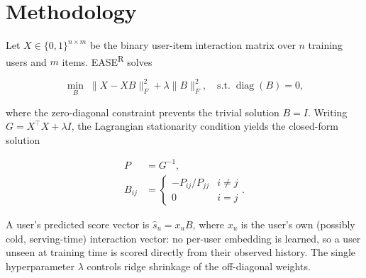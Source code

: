 \section{Methodology}
Let $X \in \{0,1\}^{n \times m}$ be the binary user-item interaction matrix
over $n$ training users and $m$ items. EASE\textsuperscript{R} solves

\begin{equation}
  \min_{B} \; \lVert X - XB \rVert_F^2 + \lambda \lVert B \rVert_F^2,
  \quad \text{s.t.} \; \operatorname{diag}(B) = 0,
  \label{eq:objective}
\end{equation}

where the zero-diagonal constraint prevents the trivial solution $B = I$.
Writing $G = X^\top X + \lambda I$, the Lagrangian stationarity condition
yields the closed-form solution

\begin{align}
  P &= G^{-1}, \label{eq:inverse} \\
  B_{ij} &= \begin{cases}
    -P_{ij} / P_{jj} & i \neq j \\
    0 & i = j
  \end{cases}. \label{eq:weights}
\end{align}

A user's predicted score vector is $\hat{s}_u = x_u B$, where $x_u$ is the
user's own (possibly cold, serving-time) interaction vector: no per-user
embedding is learned, so a user unseen at training time is scored directly
from their observed history. The single hyperparameter $\lambda$ controls
ridge shrinkage of the off-diagonal weights.
